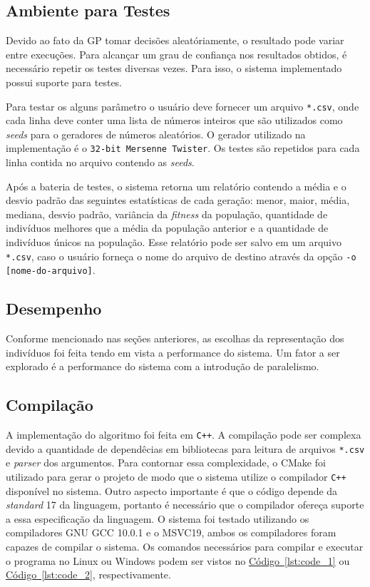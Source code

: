 \documentclass[a4paper]{article}
\begin{document}
\subsection{Ambiente para Testes}

Devido ao fato da GP tomar decisões aleatóriamente, o resultado pode variar
entre execuções. Para alcançar um grau de confiança nos resultados obtidos, é
necessário repetir os testes diversas vezes. Para isso, o sistema implementado
possui suporte para testes.

Para testar os alguns parâmetro o usuário deve fornecer um arquivo
\texttt{*.csv}, onde cada linha deve conter uma lista de números inteiros que
são utilizados como \textit{seeds} para o geradores de números aleatórios. O
gerador utilizado na implementação é o \texttt{32-bit Mersenne Twister}. Os
testes são repetidos para cada linha contida no arquivo contendo as
\textit{seeds}.

Após a bateria de testes, o sistema retorna um relatório contendo a média e o
desvio padrão das seguintes estatísticas de cada geração: menor, maior, média,
mediana, desvio padrão, variância da \textit{fitness} da população, quantidade
de indivíduos melhores que a média da população anterior e a quantidade de
indivíduos únicos na população. Esse relatório pode ser salvo em um arquivo
\texttt{*.csv}, caso o usuário forneça o nome do arquivo de destino através da
opção \texttt{-o [nome-do-arquivo]}.

\subsection{Desempenho}

Conforme mencionado nas seções anteriores, as escolhas da representação dos
indivíduos foi feita tendo em vista a performance do sistema. Um fator a ser
explorado é a performance do sistema com a introdução de paralelismo.

\subsection{Compilação}
A implementação do algoritmo foi feita em \texttt{C++}. A compilação pode ser
complexa devido a quantidade de dependêcias em bibliotecas para leitura de
arquivos \texttt{*.csv} e \textit{parser} dos argumentos. Para contornar essa
complexidade, o CMake foi utilizado para gerar o projeto de modo que o sistema
utilize o compilador \texttt{C++} disponível no sistema. Outro aspecto
importante é que o código depende da \textit{standard} 17 da linguagem, portanto
é necessário que o compilador ofereça suporte a essa especificação da
linguagem. O sistema foi testado utilizando os compiladores GNU GCC 10.0.1 e o
MSVC19, ambos os compiladores foram capazes de compilar o sistema. Os comandos
necessários para compilar e executar o programa no Linux ou Windows podem ser
vistos no \hyperref[lst:code_1]{Código~\ref*{lst:code_1}} ou
\hyperref[lst:code_2]{Código~\ref*{lst:code_2}}, respectivamente.
\end{document}
